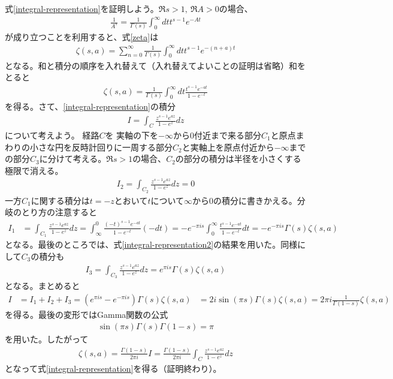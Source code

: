 \documentclass[12pt,a4paper,dvipdfmx]{jlreq}
\begin{document}
式\eqref{integral-representation}を証明しよう。$\Re s>1,\ \Re A >0$の場合、
\begin{align}
  \frac{1}{A^s}=\frac{1}{\Gamma(s)}\int_0^{\infty}dt t^{s-1} e^{-At}
\end{align}
が成り立つことを利用すると、式\eqref{zeta}は
\begin{align}
  \zeta(s,a)=\sum_{n=0}^{\infty}\frac{1}{\Gamma(s)}\int_0^{\infty}dt t^{s-1} e^{-(n+a)t}
\end{align}
となる。和と積分の順序を入れ替えて（入れ替えてよいことの証明は省略）和をとると
\begin{align}
  \zeta(s,a)=\frac{1}{\Gamma(s)}\int_0^{\infty}dt \frac{t^{s-1}e^{-at}}{1-e^{-t}}
  \label{integral-representation2}
\end{align}
を得る。さて、\eqref{integral-representation}の積分
\begin{align}
  I=\int_C \frac{z^{s-1}e^{az}}{1-e^{z}}dz
\end{align}
について考えよう。
経路$C$を
実軸の下を$-\infty$から$0$付近まで来る部分$C_1$と原点まわりの小さな円を反時計回りに一周する部分$C_2$と実軸上を原点付近から$-\infty$までの部分$C_3$に分けて考える。$\Re s>1$の場合、$C_2$の部分の積分は半径を小さくする極限で消える。
\begin{align}
  I_2=
  \int_{C_2}\frac{z^{s-1}e^{az}}{1-e^{z}}dz=0
\end{align}
一方$C_1$に関する積分は$t=-z$とおいて$t$について$\infty$から$0$の積分に書きかえる。分岐のとり方の注意すると
\begin{align}
  I_1&=\int_{C_1}\frac{z^{s-1}e^{az}}{1-e^{z}}dz
  =\int_{\infty}^{0}\frac{(-t)^{s-1}e^{-at}}{1-e^{-t}}(-dt)
  =-e^{-\pi i s}\int_{0}^{\infty}\frac{t^{s-1}e^{-at}}{1-e^{-t}}dt
  =-e^{-\pi i s}\Gamma(s)\zeta(s,a)
\end{align}
となる。最後のところでは、式\eqref{integral-representation2}の結果を用いた。同様にして$C_3$の積分も
\begin{align}
  I_3=\int_{C_3}\frac{z^{s-1}e^{az}}{1-e^{z}}dz
  =e^{\pi i s}\Gamma(s)\zeta(s,a)
\end{align}
となる。まとめると
\begin{align}
  I&=I_1+I_2+I_3=
  (e^{\pi i s}-e^{-\pi i s})\Gamma(s)\zeta(s,a)
  &=2i\sin(\pi s) \Gamma(s)\zeta(s,a)
  =2\pi i \frac{1}{\Gamma(1-s)}\zeta(s,a)
\end{align}
を得る。最後の変形ではGamma関数の公式
\begin{align}
  \sin (\pi s) \Gamma(s)\Gamma(1-s)=\pi
\end{align}
を用いた。したがって
\begin{align}
  \zeta(s,a)
  =\frac{\Gamma(1-s)}{2\pi i} I
  =\frac{\Gamma(1-s)}{2\pi i} \int_C \frac{z^{s-1}e^{az}}{1-e^{z}}dz
\end{align}
となって式\eqref{integral-representation}を得る（証明終わり）。
\end{document}
